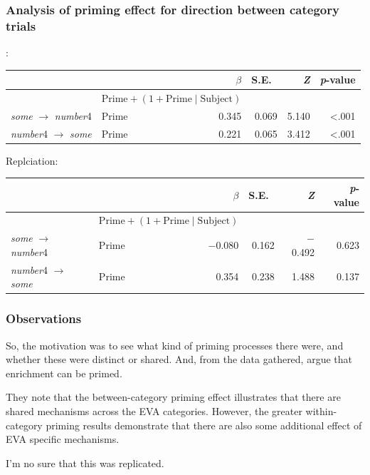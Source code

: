 \documentclass[noamssymb]{beamer}
\begin{document}
\begin{frame}

  \frametitle{{\ftf Analysis of priming effect for direction between category trials}}

  \citeauthor{Bott:2016aa}:
\begin{adjustbox}{width=1\textwidth,center=\textwidth}
    \begin{tabular}{llrrrr}
      \hline
      & & \(\beta\) & S.E.\ & \emph{Z} & \emph{p}-value  \\
      \hline
      & \multicolumn{2}{l}{\(\text{Prime} + (1 + \text{Prime} \mid \text{Subject})\)} & & & \\
      \emph{some} \(\rightarrow\) \emph{number}4 & Prime & 0.345 &  0.069 & 5.140 & <.001 \\
      \emph{number}4 \(\rightarrow\) \emph{some} & Prime & 0.221  & 0.065 & 3.412  & <.001 \\
      \hline
    \end{tabular}
  \end{adjustbox}

  Replciation:
  \begin{adjustbox}{width=1\textwidth,center=\textwidth}
    \begin{tabular}{llrrrr}
      \hline
      & & \(\beta\) & S.E.\ & \emph{Z} & \emph{p}-value  \\
      \hline
      & \multicolumn{2}{l}{\(\text{Prime} + (1 + \text{Prime} \mid \text{Subject})\)} & & & \\
      \emph{some} \(\rightarrow\) \emph{number}4 & Prime & \(-\)0.080 &  0.162 & \(-\)0.492 & 0.623 \\
      \emph{number}4 \(\rightarrow\) \emph{some} & Prime & 0.354  &  0.238 & 1.488  & 0.137 \\
      \hline
    \end{tabular}
  \end{adjustbox}
\end{frame}


\begin{frame}
  \frametitle{{\ftf Observations}}

  So, the motivation was to see what kind of priming processes there were, and whether these were distinct or shared.
  And, from the data gathered, \citeauthor{Bott:2016aa} argue that enrichment can be primed.

  They note that the between-category priming effect illustrates that there are shared mechanisms across the EVA categories.
  However, the greater within-category priming results demonstrate that there are also some additional effect of EVA speciﬁc mechanisms.

  I'm no sure that this was replicated.
\end{frame}
\end{document}

